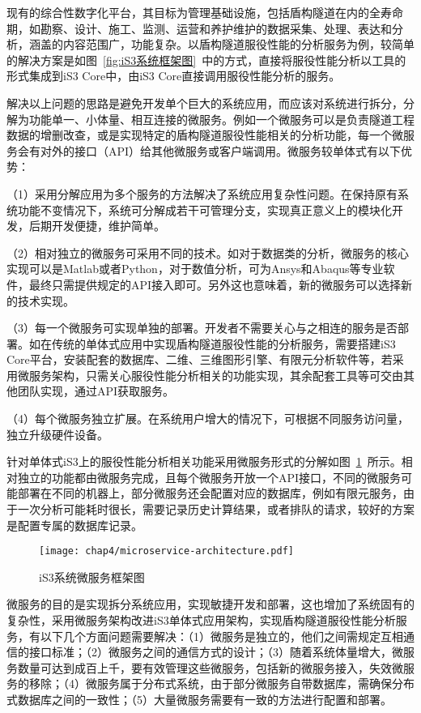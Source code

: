 现有的综合性数字化平台，其目标为管理基础设施，包括盾构隧道在内的全寿命期，如勘察、设计、施工、监测、运营和养护维护的数据采集、处理、表达和分析，涵盖的内容范围广，功能复杂。以盾构隧道服役性能的分析服务为例，较简单的解决方案是如图~\ref{fig:iS3系统框架图}~中的方式，直接将服役性能分析以工具的形式集成到iS3 Core中，由iS3 Core直接调用服役性能分析的服务。

解决以上问题的思路是避免开发单个巨大的系统应用，而应该对系统进行拆分，分解为功能单一、小体量、相互连接的微服务。例如一个微服务可以是负责隧道工程数据的增删改查，或是实现特定的盾构隧道服役性能相关的分析功能，每一个微服务会有对外的接口（API）给其他微服务或客户端调用。微服务较单体式有以下优势：

（1）采用分解应用为多个服务的方法解决了系统应用复杂性问题。在保持原有系统功能不变情况下，系统可分解成若干可管理分支，实现真正意义上的模块化开发，后期开发便捷，维护简单。

（2）相对独立的微服务可采用不同的技术。如对于数据类的分析，微服务的核心实现可以是Matlab或者Python，对于数值分析，可为Ansys和Abaqus等专业软件，最终只需提供规定的API接入即可。另外这也意味着，新的微服务可以选择新的技术实现。

（3）每一个微服务可实现单独的部署。开发者不需要关心与之相连的服务是否部署。如在传统的单体式应用中实现盾构隧道服役性能的分析服务，需要搭建iS3 Core平台，安装配套的数据库、二维、三维图形引擎、有限元分析软件等，若采用微服务架构，只需关心服役性能分析相关的功能实现，其余配套工具等可交由其他团队实现，通过API获取服务。

（4）每个微服务独立扩展。在系统用户增大的情况下，可根据不同服务访问量，独立升级硬件设备。

针对单体式iS3上的服役性能分析相关功能采用微服务形式的分解如图~\ref{fig:iS3系统微服务框架图}~所示。相对独立的功能都由微服务完成，且每个微服务开放一个API接口，不同的微服务可能部署在不同的机器上，部分微服务还会配置对应的数据库，例如有限元服务，由于一次分析可能耗时很长，需要记录历史计算结果，或者排队的请求，较好的方案是配置专属的数据库记录。

\begin{figure}[htb!]
    \centering
    \texttt{[image: chap4/microservice-architecture.pdf]}
    \caption{iS3系统微服务框架图}
    \label{fig:iS3系统微服务框架图}
\end{figure}

微服务的目的是实现拆分系统应用，实现敏捷开发和部署，这也增加了系统固有的复杂性，采用微服务架构改进iS3单体式应用架构，实现盾构隧道服役性能分析服务，有以下几个方面问题需要解决：（1）微服务是独立的，他们之间需规定互相通信的接口标准；（2）微服务之间的通信方式的设计；（3）随着系统体量增大，微服务数量可达到成百上千，要有效管理这些微服务，包括新的微服务接入，失效微服务的移除；（4）微服务属于分布式系统，由于部分微服务自带数据库，需确保分布式数据库之间的一致性；（5）大量微服务需要有一致的方法进行配置和部署。

